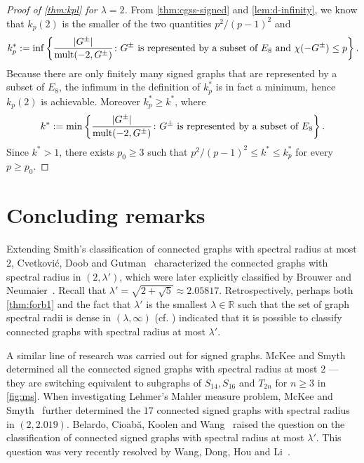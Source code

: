\documentclass[11pt]{article}
\theoremstyle{definition}
\theoremstyle{remark}
\DeclarePairedDelimiter\abs{\lvert}{\rvert}
\newcommand{\dset}[2]{\left\{{#1}\colon{#2}\right\}}
\newcommand{\la}{\lambda}
\newcommand{\R}{\mathbb{R}}
\newcommand{\mult}{\operatorname{mult}}
\begin{document}
\begin{proof}[Proof of \cref{thm:kpl} for $\la = 2$] \label{proof:la-2}
    From \cref{thm:cgss-signed} and \cref{lem:d-infinity}, we know that $k_p(2)$ is the smaller of the two quantities $p^2/(p-1)^2$ and
    \[
        k_p^* := \inf\dset{\frac{\abs{G^\pm}}{\mult(-2, G^\pm)}}{G^\pm \text{ is represented by a subset of }E_8 \text{ and } \chi(-G^\pm) \le p}.
    \]
    Because there are only finitely many signed graphs that are represented by a subset of $E_8$, the infimum in the definition of $k_p^*$ is in fact a minimum, hence $k_p(2)$ is achievable. Moreover $k_p^* \ge k^*$, where
    \begin{equation} \label{eqn:k-star}
        k^* := \min\dset{\frac{\abs{G^\pm}}{\mult(-2, G^\pm)}}{G^\pm \text{ is represented by a subset of }E_8}.
    \end{equation}
    Since $k^* > 1$, there exists $p_0 \ge 3$ such that $p^2 / (p-1)^2 \le k^* \le k_p^*$ for every $p \ge p_0$.
\end{proof}

\section{Concluding remarks} \label{sec:discussion}

Extending Smith's classification \cite{S70} of connected graphs with spectral radius at most $2$, Cvetkovi\'c, Doob and Gutman~\cite[Theorem~3.8]{CDG82} characterized the connected graphs with spectral radius in $(2, \la')$, which were later explicitly classified by Brouwer and Neumaier~\cite{BN89}. Recall that $\la' = \sqrt{2 + \sqrt5} \approx 2.05817$. Retrospectively, perhaps both \cref{thm:forb1} and the fact that $\la'$ is the smallest $\la \in \R$ such that the set of graph spectral radii is dense in $(\la, \infty)$ (cf. \cite{H72,S89}) indicated that it is possible to classify connected graphs with spectral radius at most $\la'$.

A similar line of research was carried out for signed graphs. McKee and Smyth~\cite{MS07} determined all the connected signed graphs with spectral radius at most $2$ --- they are switching equivalent to subgraphs of $S_{14}, S_{16}$ and $T_{2n}$ for $n \ge 3$ in \cref{fig:ms}. When investigating Lehmer's Mahler measure problem, McKee and Smyth~\cite[Theorem~3]{MS12} further determined the $17$ connected signed graphs with spectral radius in $(2, 2.019)$. Belardo, Cioab\u{a}, Koolen and Wang~\cite[Problem~3.11]{BCKW18} raised the question on the classification of connected signed graphs with spectral radius at most $\la'$. This question was very recently resolved by 
Wang, Dong, Hou and Li~\cite{WDHL23}.
\end{document}
